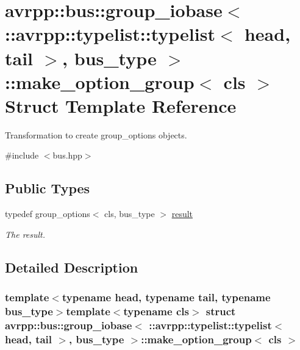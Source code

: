 \hypertarget{structavrpp_1_1bus_1_1group__iobase_3_01_1_1avrpp_1_1typelist_1_1typelist_3_01head_00_01tail_01_a212532d66805ee5c98633543044dcc5}{
\section{avrpp::bus::group\_\-iobase$<$ ::avrpp::typelist::typelist$<$ head, tail $>$, bus\_\-type $>$::make\_\-option\_\-group$<$ cls $>$ Struct Template Reference}
\label{structavrpp_1_1bus_1_1group__iobase_3_01_1_1avrpp_1_1typelist_1_1typelist_3_01head_00_01tail_01_a212532d66805ee5c98633543044dcc5}
}


Transformation to create group\_\-options objects.  




{\ttfamily \#include $<$bus.hpp$>$}

\subsection*{Public Types}
\begin{DoxyCompactItemize}
\item 
typedef group\_\-options$<$ cls, bus\_\-type $>$ \hyperlink{structavrpp_1_1bus_1_1group__iobase_3_01_1_1avrpp_1_1typelist_1_1typelist_3_01head_00_01tail_01_a212532d66805ee5c98633543044dcc5_a9f835c6e6dd9bc79f8581b9e80b8edb7}{result}
\begin{DoxyCompactList}\small\item\em The result. \item\end{DoxyCompactList}\end{DoxyCompactItemize}


\subsection{Detailed Description}
\subsubsection*{template$<$typename head, typename tail, typename bus\_\-type$>$template$<$typename cls$>$ struct avrpp::bus::group\_\-iobase$<$ ::avrpp::typelist::typelist$<$ head, tail $>$, bus\_\-type $>$::make\_\-option\_\-group$<$ cls $>$}

